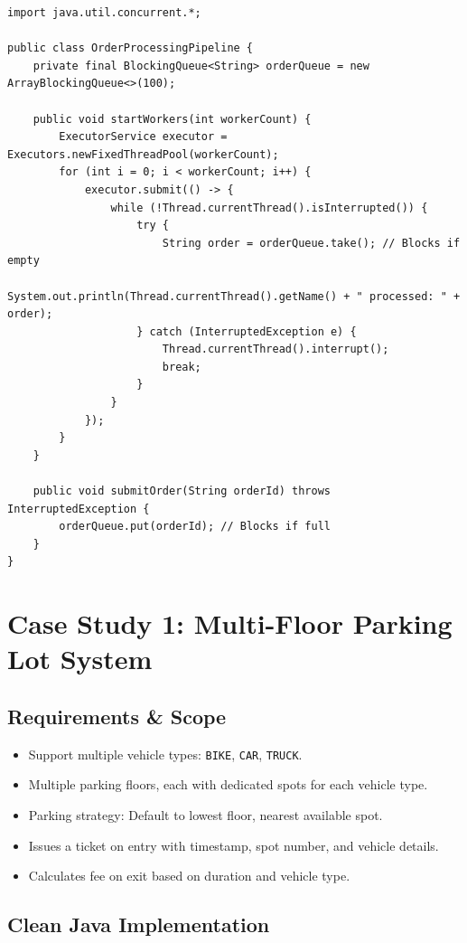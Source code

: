 \documentclass[10pt,journal,compsoc,onecolumn]{IEEEtran}
\begin{document}
\begin{verbatim}
import java.util.concurrent.*;

public class OrderProcessingPipeline {
    private final BlockingQueue<String> orderQueue = new ArrayBlockingQueue<>(100);

    public void startWorkers(int workerCount) {
        ExecutorService executor = Executors.newFixedThreadPool(workerCount);
        for (int i = 0; i < workerCount; i++) {
            executor.submit(() -> {
                while (!Thread.currentThread().isInterrupted()) {
                    try {
                        String order = orderQueue.take(); // Blocks if empty
                        System.out.println(Thread.currentThread().getName() + " processed: " + order);
                    } catch (InterruptedException e) {
                        Thread.currentThread().interrupt();
                        break;
                    }
                }
            });
        }
    }

    public void submitOrder(String orderId) throws InterruptedException {
        orderQueue.put(orderId); // Blocks if full
    }
}
\end{verbatim}

\section{Case Study 1: Multi-Floor Parking Lot System}
\label{sec:parking_lot}

\subsection{Requirements \& Scope}
\begin{itemize}
    \item Support multiple vehicle types: \texttt{BIKE}, \texttt{CAR}, \texttt{TRUCK}.
    \item Multiple parking floors, each with dedicated spots for each vehicle type.
    \item Parking strategy: Default to lowest floor, nearest available spot.
    \item Issues a ticket on entry with timestamp, spot number, and vehicle details.
    \item Calculates fee on exit based on duration and vehicle type.
\end{itemize}

\subsection{Clean Java Implementation}
\end{document}
